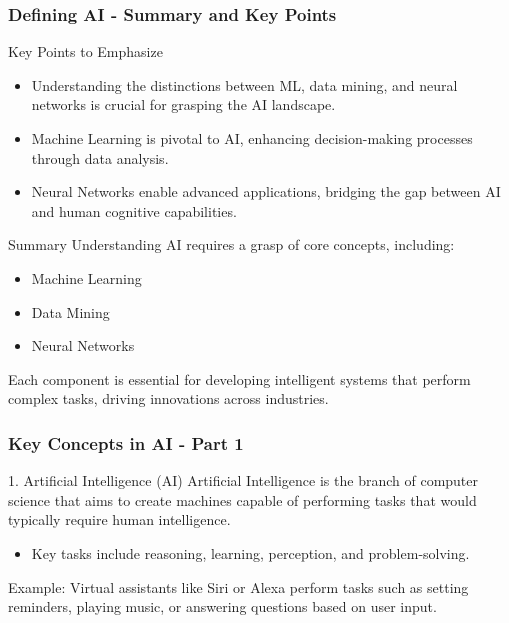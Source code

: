 \documentclass[aspectratio=169]{beamer}
\begin{document}
\begin{frame}[fragile]
    \frametitle{Defining AI - Summary and Key Points}
    \begin{block}{Key Points to Emphasize}
        \begin{itemize}
            \item Understanding the distinctions between ML, data mining, and neural networks is crucial for grasping the AI landscape.
            \item Machine Learning is pivotal to AI, enhancing decision-making processes through data analysis.
            \item Neural Networks enable advanced applications, bridging the gap between AI and human cognitive capabilities.
        \end{itemize}
    \end{block}

    \begin{block}{Summary}
        Understanding AI requires a grasp of core concepts, including:
        \begin{itemize}
            \item Machine Learning
            \item Data Mining
            \item Neural Networks
        \end{itemize}
        Each component is essential for developing intelligent systems that perform complex tasks, driving innovations across industries.
    \end{block}
\end{frame}

\begin{frame}[fragile]
    \frametitle{Key Concepts in AI - Part 1}
    \begin{block}{1. Artificial Intelligence (AI)}
        Artificial Intelligence is the branch of computer science that aims to create machines capable of performing tasks that would typically require human intelligence.
    \end{block}
    \begin{itemize}
        \item Key tasks include reasoning, learning, perception, and problem-solving.
    \end{itemize}
    \begin{exampleblock}{Example:}
        Virtual assistants like Siri or Alexa perform tasks such as setting reminders, playing music, or answering questions based on user input.
    \end{exampleblock}
\end{frame}
\end{document}
